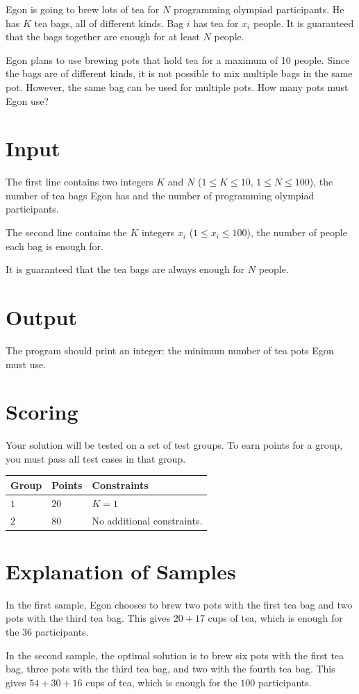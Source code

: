 Egon is going to brew lots of tea for $N$ programming olympiad participants.
He has $K$ tea bags, all of different kinds.
Bag $i$ has tea for $x_i$ people.
It is guaranteed that the bags together are enough for at least $N$ people.

Egon plans to use brewing pots that hold tea for a maximum of 10 people.
Since the bags are of different kinds,
it is not possible to mix multiple bags in the same pot.
However, the same bag can be used for multiple pots.
How many pots must Egon use?

\section*{Input}
The first line contains two integers $K$ and $N$ ($1 \le K \le 10$, $1 \le N \le 100$), the number of tea bags Egon has and the number of programming olympiad participants.

The second line contains the $K$ integers $x_i$ ($1 \le x_i \le 100$), the number of people each bag is enough for.

It is guaranteed that the tea bags are always enough for $N$ people.

\section*{Output}
The program should print an integer: the minimum number of tea pots Egon must use.

\section*{Scoring}
Your solution will be tested on a set of test groups.
To earn points for a group, you must pass all test cases in that group.

\noindent
\begin{tabular}{| l | l | l |}
  \hline
  \textbf{Group} & \textbf{Points} & \textbf{Constraints} \\ \hline
  $1$    & $20$        &  $K = 1$\\ \hline
  $2$    & $80$        &  No additional constraints. \\ \hline
\end{tabular}


\section*{Explanation of Samples}
In the first sample, Egon chooses to brew two pots with the first tea bag and two pots with the third tea bag.
This gives $20+17$ cups of tea, which
is enough for the $36$ participants.

In the second sample, the optimal solution is to brew six pots with the first tea bag,
three pots with the third tea bag, and two with the fourth tea bag.
This gives $54+30+16$ cups of tea, which is enough for the $100$ participants.
